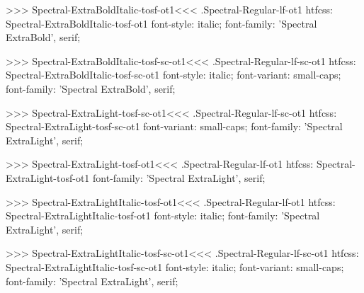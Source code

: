 >>>
\<Spectral-ExtraBoldItalic-tosf-ot1\><<<
.Spectral-Regular-lf-ot1
htfcss:  Spectral-ExtraBoldItalic-tosf-ot1  font-style: italic; font-family: 'Spectral ExtraBold', serif;

>>>
\<Spectral-ExtraBoldItalic-tosf-sc-ot1\><<<
.Spectral-Regular-lf-sc-ot1
htfcss:  Spectral-ExtraBoldItalic-tosf-sc-ot1  font-style: italic; font-variant: small-caps; font-family: 'Spectral ExtraBold', serif;

>>>
\<Spectral-ExtraLight-tosf-sc-ot1\><<<
.Spectral-Regular-lf-sc-ot1
htfcss:  Spectral-ExtraLight-tosf-sc-ot1  font-variant: small-caps; font-family: 'Spectral ExtraLight', serif;

>>>
\<Spectral-ExtraLight-tosf-ot1\><<<
.Spectral-Regular-lf-ot1
htfcss:  Spectral-ExtraLight-tosf-ot1  font-family: 'Spectral ExtraLight', serif;

>>>
\<Spectral-ExtraLightItalic-tosf-ot1\><<<
.Spectral-Regular-lf-ot1
htfcss:  Spectral-ExtraLightItalic-tosf-ot1  font-style: italic; font-family: 'Spectral ExtraLight', serif;

>>>
\<Spectral-ExtraLightItalic-tosf-sc-ot1\><<<
.Spectral-Regular-lf-sc-ot1
htfcss:  Spectral-ExtraLightItalic-tosf-sc-ot1  font-style: italic; font-variant: small-caps; font-family: 'Spectral ExtraLight', serif;

